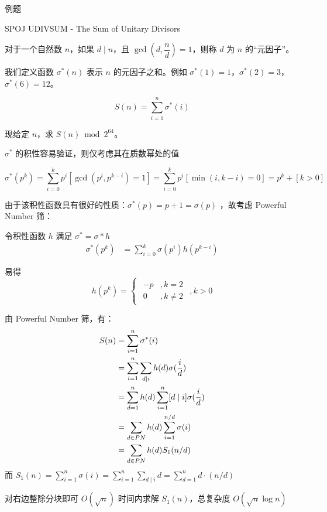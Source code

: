 \documentclass[UTF8]{beamer}
\begin{document}
\begin{frame}{例题}
    \begin{block}{SPOJ UDIVSUM - The Sum of Unitary Divisors}

对于一个自然数 $n$，如果 $d\mid n$，且 $\gcd \left(d,\dfrac{n}{d}\right)=1$，则称 $d$ 为 $n$ 的“元因子”。

我们定义函数 $\sigma^*(n)$ 表示 $n$ 的元因子之和。例如 $\sigma^*(1)=1$，$\sigma^*(2)=3$，$\sigma^*(6)=12$。

$$S(n)=\sum^n_{i=1}\sigma^*(i)$$

现给定 $n$，求 $S(n) \bmod 2^{64}$。

    \end{block}
\end{frame}
\begin{frame}
    $\sigma^{\ast}$ 的积性容易验证，则仅考虑其在质数幂处的值

$$
\sigma^{\ast}(p^k)=\sum_{i=0}^kp^i[\gcd(p^i, p^{k-i})=1]=\sum_{i=0}^k p^i[\min(i, k-i)=0]=p^k+[k>0]
$$

由于该积性函数具有很好的性质：$\sigma^{\ast}(p)=p+1=\sigma(p)$ ，故考虑 Powerful Number 筛：

令积性函数 $h$ 满足 $\sigma^{\ast}=\sigma\ast h$
$$
\begin{aligned} \sigma^{\ast}(p^k)&=\sum_{i=0}^k\sigma(p^i)h(p^{k-i}) \end{aligned}
$$


易得 
$$
h(p^k)=\begin{cases} \begin{aligned} -p&, k=2 \\ 0 &, k\neq 2 \end{aligned} \end{cases}, k>0
$$
\end{frame}
\begin{frame}
    由 Powerful Number 筛，有：
    $$
    \begin{aligned} S(n)&=\sum_{i=1}^n\sigma^{\ast}(i) \\ 
        &=\sum_{i=1}^n\sum_{d\mid i} h(d) \sigma({i\over d}) \\
        &=\sum_{d=1}^n h(d)\sum_{i=1}^n[d\mid i] \sigma({i\over d}) \\
        &=\sum_{d \in PN} h(d)\sum_{i=1}^{n/d} \sigma(i) \\
        &=\sum_{d \in PN}  h(d)S_1(n/d) 
        \end{aligned}
    $$
    而  $S_1(n)=\sum_{i=1}^n\sigma(i)=\sum_{i=1}^n \sum_{d\mid i}d=\sum_{d=1}^n d\cdot (n/d)$

    对右边整除分块即可 $O(\sqrt{n})$ 时间内求解 $S_1(n)$，总复杂度 $O(\sqrt n\log n)$
\end{frame}
\end{document}
